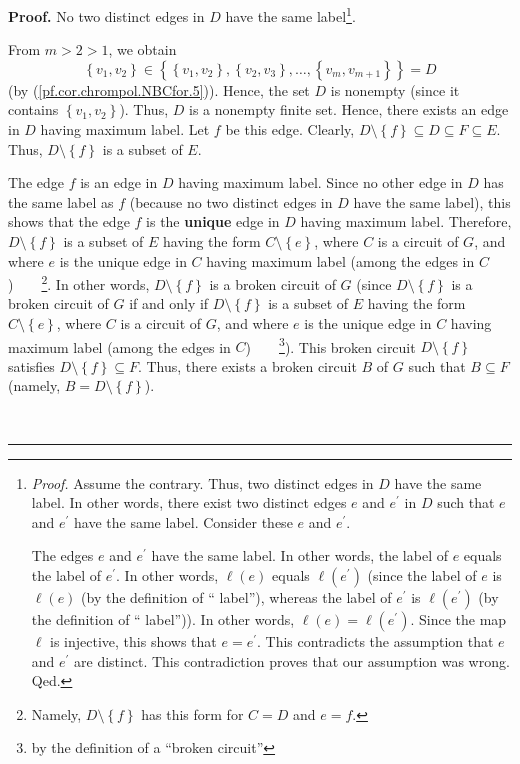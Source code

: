 \documentclass[numbers=enddot,12pt,final,onecolumn,notitlepage]{scrartcl}%
\theoremstyle{definition}
\newenvironment{proof}[1][Proof]{\noindent\textbf{#1.} }{\ \rule{0.5em}{0.5em}}
\newenvironment{verlong}{}{}
\begin{document}
\begin{verlong}
\begin{proof}
No two distinct edges in $D$ have the same label\footnote{\textit{Proof.}
Assume the contrary. Thus, two distinct edges in $D$ have the same label. In
other words, there exist two distinct edges $e$ and $e^{\prime}$ in $D$ such
that $e$ and $e^{\prime}$ have the same label. Consider these $e$ and
$e^{\prime}$.
\par
The edges $e$ and $e^{\prime}$ have the same label. In other words, the label
of $e$ equals the label of $e^{\prime}$. In other words, $\ell\left(
e\right)  $ equals $\ell\left(  e^{\prime}\right)  $ (since the label of $e$
is $\ell\left(  e\right)  $ (by the definition of \textquotedblleft
label\textquotedblright), whereas the label of $e^{\prime}$ is $\ell\left(
e^{\prime}\right)  $ (by the definition of \textquotedblleft
label\textquotedblright)). In other words, $\ell\left(  e\right)  =\ell\left(
e^{\prime}\right)  $. Since the map $\ell$ is injective, this shows that
$e=e^{\prime}$. This contradicts the assumption that $e$ and $e^{\prime}$ are
distinct. This contradiction proves that our assumption was wrong. Qed.}.

From $m>2>1$, we obtain%
\[
\left\{  v_{1},v_{2}\right\}  \in\left\{  \left\{  v_{1},v_{2}\right\}
,\left\{  v_{2},v_{3}\right\}  ,\ldots,\left\{  v_{m},v_{m+1}\right\}
\right\}  =D
\]
(by (\ref{pf.cor.chrompol.NBCfor.5})). Hence, the set $D$ is nonempty (since
it contains $\left\{  v_{1},v_{2}\right\}  $). Thus, $D$ is a nonempty finite
set. Hence, there exists an edge in $D$ having maximum label. Let $f$ be this
edge. Clearly, $D\setminus\left\{  f\right\}  \subseteq D\subseteq F\subseteq
E$. Thus, $D\setminus\left\{  f\right\}  $ is a subset of $E$.

The edge $f$ is an edge in $D$ having maximum label. Since no other edge in
$D$ has the same label as $f$ (because no two distinct edges in $D$ have the
same label), this shows that the edge $f$ is the \textbf{unique} edge in $D$
having maximum label. Therefore, $D\setminus\left\{  f\right\}  $ is a subset
of $E$ having the form $C\setminus\left\{  e\right\}  $, where $C$ is a
circuit of $G$, and where $e$ is the unique edge in $C$ having maximum label
(among the edges in $C$)\ \ \ \ \footnote{Namely, $D\setminus\left\{
f\right\}  $ has this form for $C=D$ and $e=f$.}. In other words,
$D\setminus\left\{  f\right\}  $ is a broken circuit of $G$ (since
$D\setminus\left\{  f\right\}  $ is a broken circuit of $G$ if and only if
$D\setminus\left\{  f\right\}  $ is a subset of $E$ having the form
$C\setminus\left\{  e\right\}  $, where $C$ is a circuit of $G$, and where $e$
is the unique edge in $C$ having maximum label (among the edges in
$C$)\ \ \ \ \footnote{by the definition of a \textquotedblleft broken
circuit\textquotedblright}). This broken circuit $D\setminus\left\{
f\right\}  $ satisfies $D\setminus\left\{  f\right\}  \subseteq F$. Thus,
there exists a broken circuit $B$ of $G$ such that $B\subseteq F$ (namely,
$B=D\setminus\left\{  f\right\}  $).


\end{proof}
\end{verlong}
\end{document}
